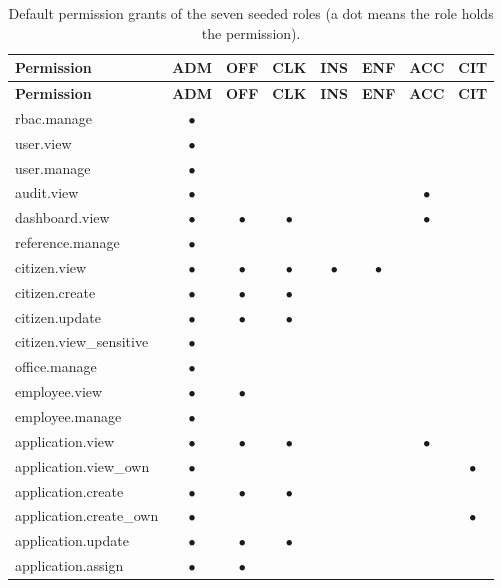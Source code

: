 \begin{longtable}{@{}p{4.6cm}ccccccc@{}}
\caption{Default permission grants of the seven seeded roles (a dot means the role holds the permission).}\label{tab:permmatrix}\\
\toprule \textbf{Permission} & \textbf{ADM} & \textbf{OFF} & \textbf{CLK} & \textbf{INS} & \textbf{ENF} & \textbf{ACC} & \textbf{CIT} \\ \midrule \endfirsthead
\toprule \textbf{Permission} & \textbf{ADM} & \textbf{OFF} & \textbf{CLK} & \textbf{INS} & \textbf{ENF} & \textbf{ACC} & \textbf{CIT} \\ \midrule \endhead
\bottomrule \endlastfoot
rbac.manage & $\bullet$ &  &  &  &  &  &  \\
user.view & $\bullet$ &  &  &  &  &  &  \\
user.manage & $\bullet$ &  &  &  &  &  &  \\
audit.view & $\bullet$ &  &  &  &  & $\bullet$ &  \\
dashboard.view & $\bullet$ & $\bullet$ & $\bullet$ &  &  & $\bullet$ &  \\
reference.manage & $\bullet$ &  &  &  &  &  &  \\
citizen.view & $\bullet$ & $\bullet$ & $\bullet$ & $\bullet$ & $\bullet$ &  &  \\
citizen.create & $\bullet$ & $\bullet$ & $\bullet$ &  &  &  &  \\
citizen.update & $\bullet$ & $\bullet$ & $\bullet$ &  &  &  &  \\
citizen.view\_\allowbreak{}sensitive & $\bullet$ &  &  &  &  &  &  \\
office.manage & $\bullet$ &  &  &  &  &  &  \\
employee.view & $\bullet$ & $\bullet$ &  &  &  &  &  \\
employee.manage & $\bullet$ &  &  &  &  &  &  \\
application.view & $\bullet$ & $\bullet$ & $\bullet$ &  &  & $\bullet$ &  \\
application.view\_\allowbreak{}own & $\bullet$ &  &  &  &  &  & $\bullet$ \\
application.create & $\bullet$ & $\bullet$ & $\bullet$ &  &  &  &  \\
application.create\_\allowbreak{}own & $\bullet$ &  &  &  &  &  & $\bullet$ \\
application.update & $\bullet$ & $\bullet$ & $\bullet$ &  &  &  &  \\
application.assign & $\bullet$ & $\bullet$ &  &  &  &  &  \\

\end{longtable}
